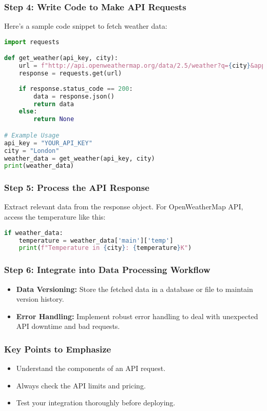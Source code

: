 \documentclass[aspectratio=169]{beamer}
\begin{document}
\begin{frame}[fragile]
  \frametitle{Step 4: Write Code to Make API Requests}
  Here’s a sample code snippet to fetch weather data:
  \begin{lstlisting}[language=Python]
import requests

def get_weather(api_key, city):
    url = f"http://api.openweathermap.org/data/2.5/weather?q={city}&appid={api_key}"
    response = requests.get(url)
    
    if response.status_code == 200:
        data = response.json()
        return data
    else:
        return None

# Example Usage
api_key = "YOUR_API_KEY"
city = "London"
weather_data = get_weather(api_key, city)
print(weather_data)
  \end{lstlisting}
\end{frame}

\begin{frame}[fragile]
  \frametitle{Step 5: Process the API Response}
  Extract relevant data from the response object. For OpenWeatherMap API, access the temperature like this:
  \begin{lstlisting}[language=Python]
if weather_data:
    temperature = weather_data['main']['temp']
    print(f"Temperature in {city}: {temperature}K")
  \end{lstlisting}
\end{frame}

\begin{frame}
  \frametitle{Step 6: Integrate into Data Processing Workflow}
  \begin{itemize}
    \item \textbf{Data Versioning:} Store the fetched data in a database or file to maintain version history.
    \item \textbf{Error Handling:} Implement robust error handling to deal with unexpected API downtime and bad requests.
  \end{itemize}
\end{frame}

\begin{frame}
  \frametitle{Key Points to Emphasize}
  \begin{itemize}
    \item Understand the components of an API request.
    \item Always check the API limits and pricing.
    \item Test your integration thoroughly before deploying.
  \end{itemize}
\end{frame}
\end{document}
